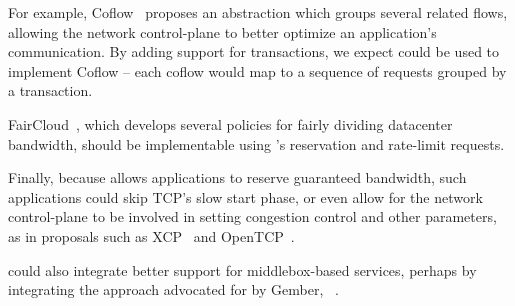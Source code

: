 For example, Coflow~\cite{Chowdhury12coflow} proposes an abstraction which
groups several related flows, allowing the network control-plane to better
optimize an application's communication. By adding support for transactions, we
expect \sys could be used to implement Coflow -- each coflow would map
to a sequence of \sys requests grouped by a transaction.

FairCloud~\cite{Popa:2012}, which develops several policies for fairly
dividing datacenter bandwidth, should be implementable using \sys's
reservation and rate-limit requests.

Finally, because \sys allows applications to reserve guaranteed
bandwidth, such applications could skip TCP's slow start phase, or
even allow for the network control-plane to be involved in setting
congestion control and other parameters, as in proposals such as
XCP~\cite{Katabi:2002} and OpenTCP~\cite{OpenTCP}.

\sys could also integrate better support for middlebox-based services,
perhaps by integrating the approach advocated for by Gember,
\etal~\cite{Gember:2012}.
